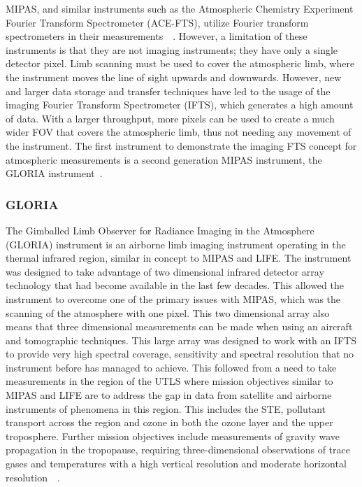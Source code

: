 MIPAS, and similar instruments such as the Atmospheric Chemistry Experiment Fourier Transform Spectrometer (ACE-FTS), utilize Fourier transform spectrometers in their measurements~\citep{SPARC}~\citep{ACE_conference}. However, a limitation of these instruments is that they are not imaging instruments; they have only a single detector pixel. Limb scanning must be used to cover the atmospheric limb, where the instrument moves the line of sight upwards and downwards. However, new and larger data storage and transfer techniques have led to the usage of the imaging Fourier Transform Spectrometer (IFTS), which generates a high amount of data. With a larger throughput, more pixels can be used to create a much wider FOV that covers the atmospheric limb, thus not needing any movement of the instrument. The first instrument to demonstrate the imaging FTS concept for atmospheric measurements is a second generation MIPAS instrument, the GLORIA instrument~\citep{GLORIA_concept}.

\subsubsection{GLORIA}
The Gimballed Limb Observer for Radiance Imaging in the Atmosphere (GLORIA) instrument is an airborne limb imaging instrument operating in the thermal infrared region, similar in concept to MIPAS and LIFE. The instrument was designed to take advantage of two dimensional infrared detector array technology that had become available in the last few decades. This allowed the instrument to overcome one of the primary issues with MIPAS, which was the scanning of the atmosphere with one pixel. This two dimensional array also means that three dimensional measurements can be made when using an aircraft and tomographic techniques. This large array was designed to work with an IFTS to provide very high spectral coverage, sensitivity and spectral resolution that no instrument before has managed to achieve. This followed from a need to take measurements in the region of the UTLS where mission objectives similar to MIPAS and LIFE are to address the gap in data from satellite and airborne instruments of phenomena in this region. This includes the STE, pollutant transport across the region and ozone in both the ozone layer and the upper troposphere. Further mission objectives include measurements of gravity wave propagation in the tropopause, requiring three-dimensional observations of trace gases and temperatures with a high vertical resolution and moderate horizontal resolution~\citep{GLORIA_concept}~\citep{GLORIA_objectives}. 

